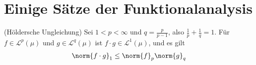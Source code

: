 \section{Einige Sätze der Funktionalanalysis}
\begin{satz}(Höldersche Ungleichung)\label{a:hoelder}
Sei $1 < p < \infty$  und $q = \frac{p}{p-1}$, also $\frac{1}{p} + \frac{1}{q} = 1$. Für $f \in \mathscr{L}^p(\mu)$ und $g \in \mathscr{L}^q(\mu)$ ist $f \cdot g \in \mathscr{L}^1(\mu)$, und es gilt
\begin{align}
	\norm{f \cdot g}_1 \leq \norm{f}_p \norm{g}_q
\end{align} \cite[Seite 247]{Werner2006}
\end{satz}
